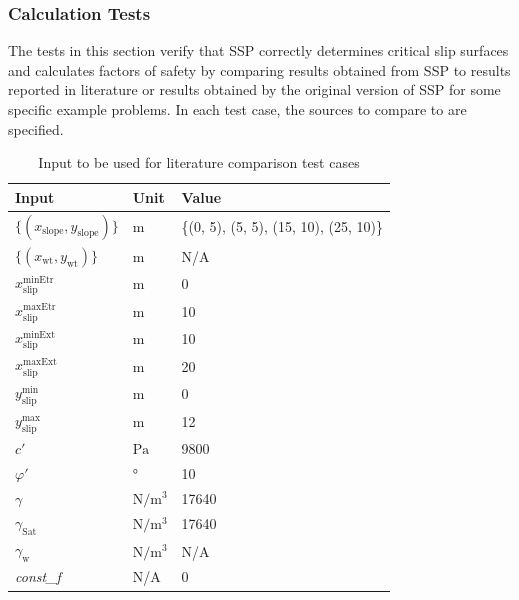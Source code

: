 \documentclass[12pt, titlepage]{article}
\newcommand{\progname}{SSP}
\begin{document}

\subsubsection{Calculation Tests} \label{sec_CalcTCs}

The tests in this section verify that \progname{} correctly determines critical 
slip surfaces and calculates factors of safety by comparing results obtained 
from \progname{} to results reported in literature or results obtained by the 
original version of \progname{} for some specific example problems. In each 
test case, the sources to compare to are specified.

\begin{table}[h!]
\renewcommand{\arraystretch}{1.5}
\begin{tabularx}{1.0\textwidth}{p{7cm} l X}
	\toprule \textbf{Input} &
	\textbf{Unit} & \textbf{Value}\\ \midrule
	$\{\left(x_\text{slope},y_\text{slope}\right)\}$ & $\text{m}$ & \{(0, 5), 
	(5, 5), (15, 10), (25, 10)\}\\
	$\{\left(x_\text{wt},y_\text{wt}\right)\}$ & $\text{m}$ & N/A\\
	${x_\text{slip}^\text{minEtr}}$ & $\text{m}$ & 0\\
	${x_\text{slip}^\text{maxEtr}}$ & $\text{m}$ & 10\\
	${x_\text{slip}^\text{minExt}}$ & $\text{m}$ & 10\\
	${x_\text{slip}^\text{maxExt}}$ & $\text{m}$ & 20\\
	${y_\text{slip}^\text{min}}$ & $\text{m}$ & 0\\
	${y_\text{slip}^\text{max}}$ & $\text{m}$ & 12\\
	$c'$ & $\si{\pascal}$ & 9800 \\
	$\varphi'$ & \si{\degree} & 10\\
	$\gamma$ & $\si{\newton\per\meter\cubed}$ & 17640 \\
	$\gamma_{\text{Sat}}$ & $\si{\newton\per\meter\cubed}$ & 17640 \\
	$\gamma_{\text{w}}$ & $\si{\newton\per\meter\cubed}$ & N/A \\
	\textit{const\_f} & N/A & 0\\ 
	\bottomrule
\end{tabularx}
\caption{Input to be used for literature comparison test cases}
\label{Ex1Input}
\end{table}
\end{document}
